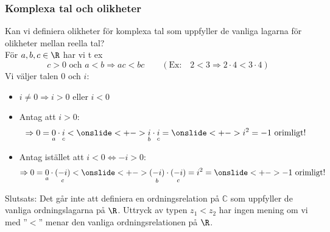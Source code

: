 \documentclass[slidestop,blue,handout,9pt]{beamer}
\begin{document}
\begin{frame} 
\frametitle{Komplexa tal och olikheter}
Kan vi definiera olikheter för komplexa tal som uppfyller de
vanliga lagarna för olikheter mellan reella tal? \\
\pause
För $a,b,c\in\R$ har vi t ex
\[
c > 0  \text{ och } a < b \Rightarrow ac < bc \qquad (\text{Ex:}\quad 2<3\Rightarrow 2\cdot 4<3\cdot 4)
\]
\pause
Vi väljer talen $0$ och $i$:
\onslide<+->
\begin{itemize}
\item $i \neq 0 \Rightarrow i>0$ eller $i<0$
\item Antag att $i> 0$:
\onslide<+->
\[
\Rightarrow 0 = \underset{a}{0}\cdot \underset{c}{i} < \onslide<+->
\underset{b}{i}\cdot\underset{c}{i}= \onslide<+-> i^2 = -1 \text{ orimligt!}
\]
\item Antag istället att $i < 0 \Leftrightarrow -i > 0$:
\onslide<+->
\[
\Rightarrow 0 = \underset{a}{0}\cdot \underset{c}{(-i)} <\onslide<+->
\underset{b}{(-i)}\cdot\underset{c}{(-i)}= i^2 = \onslide<+->-1 \text{ orimligt!}
\]
\end{itemize}
\begin{block}{}
\alert{Slutsats:} Det går inte att definiera en ordningsrelation på $\mathbb{C}$ som uppfyller de
vanliga ordningslagarna på $\R$. Uttryck av typen $z_1 < z_2$
har ingen mening om vi med ''$<$'' menar den vanliga ordningsrelationen på $\R$.
\end{block} 

\end{frame}
\end{document}
